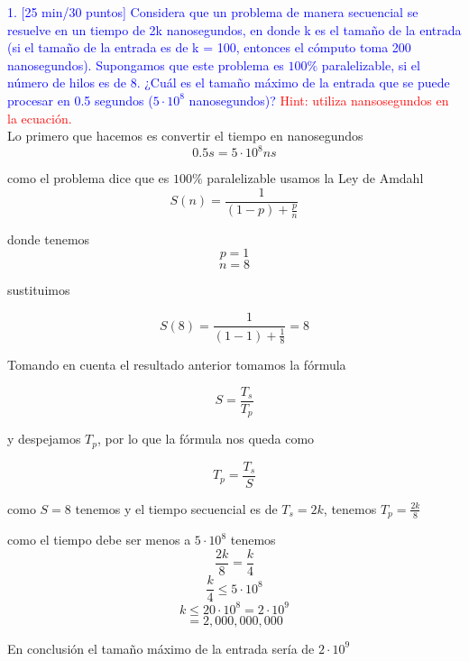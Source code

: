 \textcolor{blue}{1. [25 min/30 puntos] Considera que un problema de manera secuencial se resuelve en un tiempo
de 2k nanosegundos, en donde k es el tamaño de la entrada (si el tamaño de la entrada es de
k = 100, entonces el cómputo toma 200 nanosegundos). Supongamos que este problema es $100\%$
paralelizable, si el número de hilos es de 8. ¿Cuál es el tamaño máximo de la entrada que se puede
procesar en 0.5 segundos ($5 \cdot 10^8$ nanosegundos)?} \textcolor{red}{Hint: utiliza nansosegundos en la ecuación.}\\

Lo primero que hacemos es convertir el tiempo en nanosegundos 
$$0.5 s = 5 \cdot10^8 ns$$

como el problema dice que es $100\%$ paralelizable usamos la Ley de Amdahl
$$S(n)=\frac{1}{(1-p)+\frac{p}{n}}$$

donde tenemos 
$$p=1$$
$$n=8$$

sustituimos

$$S(8)=\frac{1}{(1-1)+\frac{1}{8}} = 8$$

Tomando en cuenta el resultado anterior tomamos la fórmula 

$$S= \frac{T_s}{T_p}$$ 

y despejamos $T_p$, por lo que la fórmula nos queda como 

$$T_p = \frac{T_s}{S}$$

como $S=8$ tenemos y el tiempo secuencial es de $T_s= 2k$, tenemos $T_p=\frac{2k}{8}$

como el tiempo debe ser menos a $5\cdot10^8$ tenemos
$$\frac{2k}{8} = \frac{k}{4}$$
$$ \frac{k}{4} \leq 5\cdot10^8$$
$$k \leq 20 \cdot10^8= 2 \cdot10^9$$
$$= 2,000,000,000$$

En conclusión el tamaño máximo de la entrada sería de $2\cdot10^9$ \\